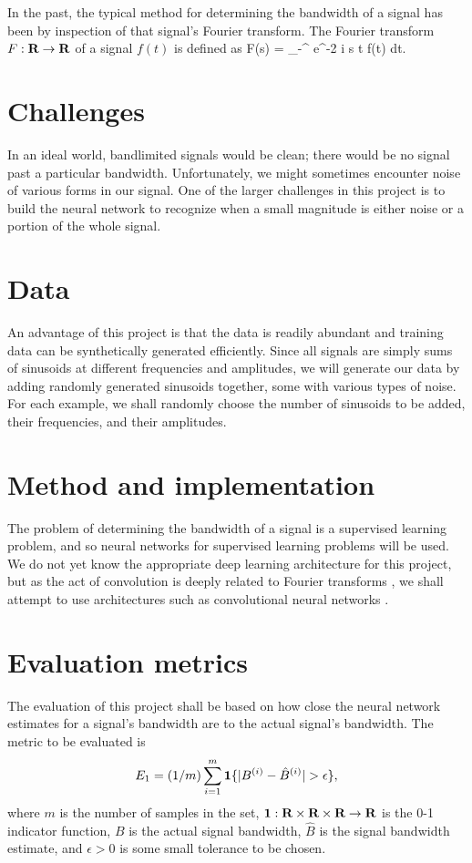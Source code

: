 \documentclass[12pt]{article}
\begin{document}
In the past, the typical method for determining the bandwidth of a signal has been by inspection of that
signal's Fourier transform. The Fourier transform $F: {\mbox{\bf R}} \rightarrow {\mbox{\bf R}}$ of a signal $f(t)$ is 
defined as
\BEQ
F(s) = \int_{-\infty}^{\infty} e^{-2 \pi i s t} f(t) dt.
\EEQ

\section{Challenges}
In an ideal world, bandlimited signals would be clean; there would be no signal past 
a particular bandwidth. Unfortunately, we might sometimes encounter noise of various forms 
in our signal. One of the larger challenges in this project is to build the neural network 
to recognize when a small magnitude is either noise or a portion of the whole signal.

\section{Data}
An advantage of this project is that the data is readily abundant and training data can be
synthetically generated efficiently. Since all signals are simply sums of sinusoids at different
frequencies and amplitudes, we will generate our data by adding randomly generated sinusoids together, 
some with various types of noise. For each example, we shall randomly choose the number of sinusoids 
to be added, their frequencies, and their amplitudes.

\section{Method and implementation}
The problem of determining the bandwidth of a signal is a supervised learning problem, and so
neural networks for supervised learning problems will be used. We do not yet know the appropriate
deep learning architecture for this project, but as the act of convolution is deeply related to Fourier 
transforms \cite{B:78,O:17}, we shall attempt to use architectures such as convolutional neural networks 
\cite{LBBH:98,RSA:15}.

\section{Evaluation metrics}
The evaluation of this project shall be based on how close the neural network estimates for 
a signal's bandwidth are to the actual signal's bandwidth. The metric to be evaluated is
\[
E_1 = (1/m) \sum_{i=1}^{m} \mathbf 1\{|B^{(i)} - \hat B^{(i)}| > \epsilon\},
\]
where $m$ is the number of samples in the set, 
$\mathbf 1 : {\mbox{\bf R}} \times {\mbox{\bf R}} \times {\mbox{\bf R}} \rightarrow {\mbox{\bf R}}$ is the 0-1 indicator function, 
$B$ is the actual signal bandwidth, $\hat B$ is the signal bandwidth estimate,
and $\epsilon > 0$ is some small tolerance to be chosen.

\newpage

\end{document}
